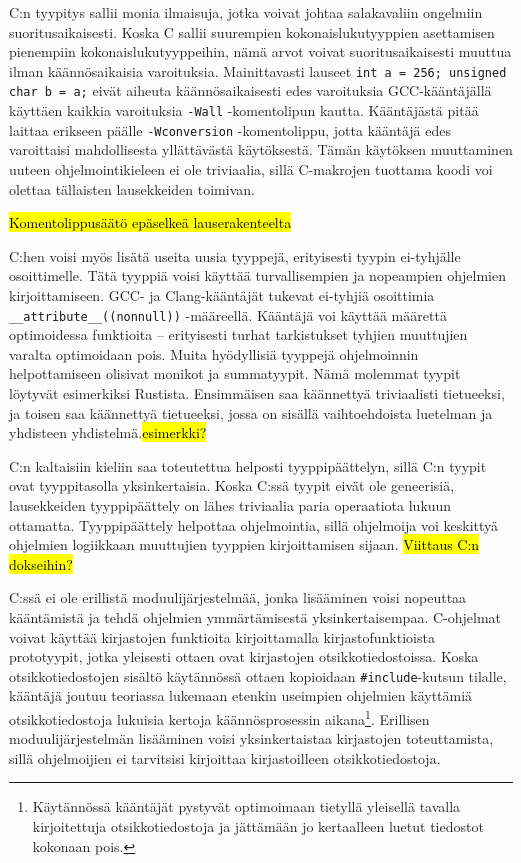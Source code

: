 C:n tyypitys sallii monia ilmaisuja, jotka voivat johtaa salakavaliin ongelmiin
suoritusaikaisesti. Koska C sallii suurempien kokonaislukutyyppien asettamisen
pienempiin kokonaislukutyyppeihin, nämä arvot voivat suoritusaikaisesti muuttua
ilman käännösaikaisia varoituksia. Mainittavasti lauseet \texttt{int a = 256;
unsigned char b = a;} eivät aiheuta käännösaikaisesti edes varoituksia
GCC-kääntäjällä käyttäen kaikkia varoituksia \texttt{-Wall} -komentolipun
kautta. Kääntäjästä pitää laittaa erikseen päälle \texttt{-Wconversion}
-komentolippu, jotta kääntäjä edes varoittaisi mahdollisesta yllättävästä
käytöksestä. Tämän käytöksen muuttaminen uuteen ohjelmointikieleen ei ole
triviaalia, sillä C-makrojen tuottama koodi voi olettaa tällaisten lausekkeiden
toimivan.

\hl{Komentolippusäätö epäselkeä lauserakenteelta}

C:hen voisi myös lisätä useita uusia tyyppejä, erityisesti tyypin ei-tyhjälle
osoittimelle. Tätä tyyppiä voisi käyttää turvallisempien ja nopeampien
ohjelmien kirjoittamiseen. GCC- ja Clang-kääntäjät tukevat ei-tyhjiä osoittimia
\texttt{\_\_attribute\_\_((nonnull))} -määreellä. Kääntäjä voi käyttää määrettä
optimoidessa funktioita -- erityisesti turhat tarkistukset tyhjien muuttujien
varalta optimoidaan pois. Muita hyödyllisiä tyyppejä ohjelmoinnin
helpottamiseen olisivat monikot ja summatyypit. Nämä molemmat tyypit löytyvät esimerkiksi Rustista.
Ensimmäisen saa käännettyä triviaalisti tietueeksi, ja toisen saa käännettyä
tietueeksi, jossa on sisällä vaihtoehdoista luetelman ja
yhdisteen yhdistelmä.\hl{esimerkki?}

C:n kaltaisiin kieliin saa toteutettua helposti tyyppipäättelyn, sillä C:n
tyypit ovat tyyppitasolla yksinkertaisia. Koska C:ssä tyypit eivät ole
geneerisiä, lausekkeiden tyyppipäättely on lähes triviaalia paria operaatiota
lukuun ottamatta. Tyyppipäättely helpottaa ohjelmointia, sillä ohjelmoija
voi keskittyä ohjelmien logiikkaan muuttujien tyyppien kirjoittamisen sijaan.
\hl{Viittaus C:n dokseihin?}

C:ssä ei ole erillistä moduulijärjestelmää, jonka lisääminen voisi nopeuttaa
kääntämistä ja tehdä ohjelmien ymmärtämisestä yksinkertaisempaa. C-ohjelmat
voivat käyttää kirjastojen funktioita kirjoittamalla kirjastofunktioista
prototyypit, jotka yleisesti ottaen ovat kirjastojen otsikkotiedostoissa. Koska
otsikkotiedostojen sisältö käytännössä ottaen kopioidaan
\texttt{\#include}-kutsun tilalle, kääntäjä joutuu teoriassa lukemaan etenkin
useimpien ohjelmien käyttämiä otsikkotiedostoja lukuisia kertoja
käännösprosessin aikana\footnote{Käytännössä kääntäjät pystyvät optimoimaan
tietyllä yleisellä tavalla kirjoitettuja otsikkotiedostoja ja jättämään jo
kertaalleen luetut tiedostot kokonaan pois.}. Erillisen moduulijärjestelmän
lisääminen voisi yksinkertaistaa kirjastojen toteuttamista, sillä ohjelmoijien
ei tarvitsisi kirjoittaa kirjastoilleen otsikkotiedostoja. 

